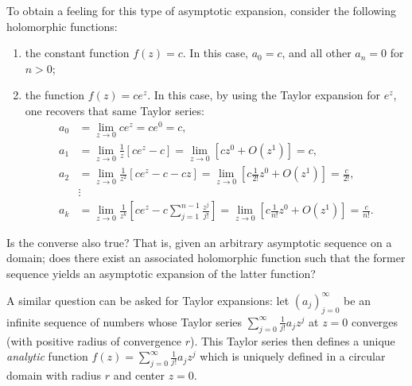 {
\color{blue}
\bexample
To obtain a feeling for this type of asymptotic expansion, consider the following holomorphic functions:
\begin{enumerate}

\item
the constant function $f(z)=c$.
In this case, $a_0=c$, and all other $a_n=0$ for $n>0$;


\item
the function $f(z)=c e^z$.
In this case, by using the Taylor expansion for $e^z$, one recovers that same Taylor series:
\begin{align*}
a_0 &= \lim_{z\rightarrow 0}  c e^z = c e^0 =c,\\
a_1 &= \lim_{z\rightarrow 0} \frac{1}{z} \left[c e^z - c \right] = \lim_{z\rightarrow 0} \left[c z^0 +O(z^1)\right] =c,\\
a_2 &= \lim_{z\rightarrow 0} \frac{1}{z^2} \left[c e^z - c - c z \right] = \lim_{z\rightarrow 0} \left[c \frac{1}{2!} z^0 +O(z^1)\right] =\frac{c}{2!},\\
&\vdots                                                                                                                                                  \\
a_k &= \lim_{z\rightarrow 0} \frac{1}{z^k} \left[c e^z - c\sum_{j=1}^{n-1} \frac{z^j}{j!}  \right] = \lim_{z\rightarrow 0} \left[c \frac{1}{n!} z^0 +O(z^1)\right] =\frac{c}{n!}.
\end{align*}

\end{enumerate}
\eexample
}

Is the converse also true? That is, given an arbitrary asymptotic sequence on a domain;
does there exist an associated holomorphic function such that the former sequence yields
an asymptotic expansion of the latter function?

A similar question can be asked for Taylor expansions: let $(a_j)_{j=0}^\infty$ be an infinite sequence of numbers whose Taylor series
$\sum_{j=0}^\infty \frac{1}{j!}a_jz^j$ at $z=0$ converges (with positive radius of convergence $r$).
This Taylor series then defines a unique {\em analytic} function $f(z) = \sum_{j=0}^\infty \frac{1}{j!}a_jz^j$
which is uniquely defined in a circular domain with radius $r$ and center $z=0$.


